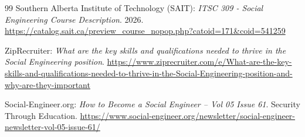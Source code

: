\documentclass[10pt,a4paper]{article}
\begin{document}
\begin{thebibliography}{99}
		Southern Alberta Institute of Technology (SAIT): \textit{ITSC 309 - Social Engineering Course Description}. 2026. \url{https://catalog.sait.ca/preview_course_nopop.php?catoid=171&coid=541259}
		
		ZipRecruiter: \textit{What are the key skills and qualifications needed to thrive in the Social Engineering position}. \url{https://www.ziprecruiter.com/e/What-are-the-key-skills-and-qualifications-needed-to-thrive-in-the-Social-Engineering-position-and-why-are-they-important}
		
		Social-Engineer.org: \textit{How to Become a Social Engineer – Vol 05 Issue 61}. Security Through Education. \url{https://www.social-engineer.org/newsletter/social-engineer-newsletter-vol-05-issue-61/}
		
	\end{thebibliography}
	
\end{document}
